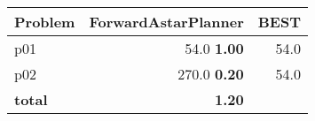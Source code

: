 \begin{tabular}{|l|r|r|}
\hline
\textbf{Problem} & \textbf{ForwardAstarPlanner} & \textbf{BEST}\\
\hline
p01 & {\footnotesize 54.0} \textbf{1.00} & 54.0\\
p02 & {\footnotesize 270.0} \textbf{0.20} & 54.0\\
\hline
\textbf{total} & \textbf{1.20} & \\
\hline
\end{tabular}
